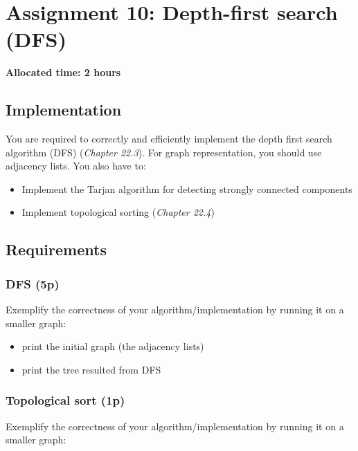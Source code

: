 \documentclass[../en-fa-lab.tex]{subfiles}
\begin{document}
\section{\texorpdfstring{\textbf{Assignment 10: Depth-first search (DFS)}}{Assignment 10: Depth-first search (DFS)}}\label{assign10}
\textbf{}

\textbf{Allocated time: 2 hours}

\subsection{Implementation}\label{implementation}

You are required to correctly and efficiently implement the depth first
search algorithm (DFS) (\emph{Chapter 22.3\citep{cormen}}). For
graph representation, you should use adjacency lists. You also have to:

\begin{itemize}
\item
  Implement the Tarjan algorithm for detecting strongly connected
  components
\item
  Implement topological sorting (\emph{Chapter 22.4\citep{cormen}})
\end{itemize}

\subsection{Requirements}\label{requirements}

\subsubsection{DFS (5p)}\label{dfs-5p}

Exemplify the correctness of your algorithm/implementation by running it
on a smaller graph:

\begin{itemize}
\item
  print the initial graph (the adjacency lists)
\item
  print the tree resulted from DFS
\end{itemize}

\subsubsection{Topological sort (1p)}\label{topological-sort-1p}

Exemplify the correctness of your algorithm/implementation by running it
on a smaller graph:
\end{document}
